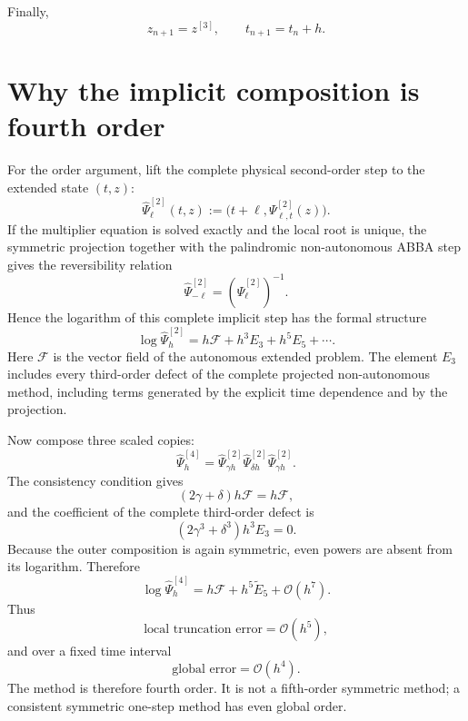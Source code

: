 \documentclass[11pt,a4paper]{article}
\newcommand{\OO}{\mathcal{O}}
\newcommand{\Psitwo}{\Psi^{[2]}}
\newcommand{\Psifour}{\Psi^{[4]}}
\begin{document}
Finally,
\begin{equation}
    \boxed{z_{n+1}=z^{[3]},\qquad t_{n+1}=t_n+h.}
\end{equation}

\section{Why the implicit composition is fourth order}
For the order argument, lift the complete physical second-order step to the extended state $(t,z)$:
\begin{equation}
    \widehat\Psitwo_{\ell}(t,z)
    :=\bigl(t+\ell,\Psitwo_{\ell,t}(z)\bigr).
\end{equation}
If the multiplier equation is solved exactly and the local root is unique, the symmetric projection together with the palindromic non-autonomous ABBA step gives the reversibility relation
\begin{equation}
    \widehat\Psitwo_{-\ell}
    =\left(\widehat\Psitwo_{\ell}\right)^{-1}.
\end{equation}
Hence the logarithm of this complete implicit step has the formal structure
\begin{equation}
    \log\widehat\Psitwo_h
    =h\mathcal F+h^3E_3+h^5E_5+\cdots.
    \label{eq:logS2}
\end{equation}
Here $\mathcal F$ is the vector field of the autonomous extended problem. The element $E_3$ includes every third-order defect of the complete projected non-autonomous method, including terms generated by the explicit time dependence and by the projection.

Now compose three scaled copies:
\begin{equation}
    \widehat\Psifour_h
    =\widehat\Psitwo_{\gamma h}
     \widehat\Psitwo_{\delta h}
     \widehat\Psitwo_{\gamma h}.
\end{equation}
The consistency condition gives
\begin{equation}
    (2\gamma+\delta)h\mathcal F=h\mathcal F,
\end{equation}
and the coefficient of the complete third-order defect is
\begin{equation}
    (2\gamma^3+\delta^3)h^3E_3=0.
\end{equation}
Because the outer composition is again symmetric, even powers are absent from its logarithm. Therefore
\begin{equation}
    \boxed{
    \log\widehat\Psifour_h
    =h\mathcal F+h^5\widetilde E_5+\OO(h^7).
    }
\end{equation}
Thus
\begin{equation}
    \boxed{\text{local truncation error}=\OO(h^5),}
\end{equation}
and over a fixed time interval
\begin{equation}
    \boxed{\text{global error}=\OO(h^4).}
\end{equation}
The method is therefore fourth order. It is not a fifth-order symmetric method; a consistent symmetric one-step method has even global order.
\end{document}
